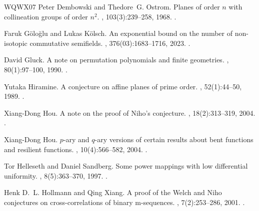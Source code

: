 \documentclass[12pt]{article}
\begin{document}
\begin{thebibliography}{WQWX07}
Peter Dembowski and Thedore~G. Ostrom.
\newblock Planes of order $n$ with collineation groups of order $n^2$.
, 103(3):239--258, 1968.
\newblock \href {https://doi.org/10.1007/BF01111042}
  {}.

Faruk G{\"o}lo{\u{g}}lu and Lukas K{\"o}lsch.
\newblock An exponential bound on the number of non-isotopic commutative
  semifields.
, 376(03):1683--1716, 2023.
\newblock \href {https://doi.org/10.1090/tran/8785}
  {}.

David Gluck.
\newblock A note on permutation polynomials and finite geometries.
, 80(1):97--100, 1990.
\newblock \href {https://doi.org/10.1016/0012-365X(90)90299-W}
  {}.

Yutaka Hiramine.
\newblock A conjecture on affine planes of prime order.
, 52(1):44--50, 1989.
\newblock \href {https://doi.org/10.1016/0097-3165(89)90060-5}
  {}.

Xiang-Dong Hou.
\newblock A note on the proof of {Niho's} conjecture.
, 18(2):313--319, 2004.
\newblock \href {https://doi.org/10.1137/S0895480103432817}
  {}.

Xiang-Dong Hou.
\newblock $p$-ary and $q$-ary versions of certain results about bent functions
  and resilient functions.
, 10(4):566--582, 2004.
\newblock \href {https://doi.org/10.1016/J.FFA.2003.12.004}
  {}.

Tor Helleseth and Daniel Sandberg.
\newblock Some power mappings with low differential uniformity.
, 8(5):363--370, 1997.
\newblock \href {https://doi.org/10.1007/S002000050073}
  {}.

Henk D.~L. Hollmann and Qing Xiang.
\newblock A proof of the {Welch} and {Niho} conjectures on cross-correlations
  of binary m-sequences.
, 7(2):253--286, 2001.
\newblock \href {https://doi.org/10.1006/ffta.2000.0281}
  {}.


\end{thebibliography}
\end{document}
